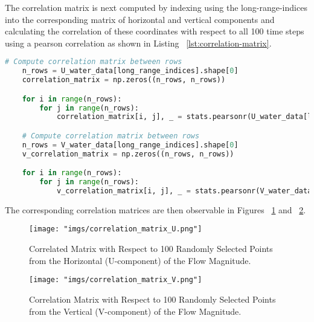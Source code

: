 \documentclass[11pt]{article}
\begin{document}
The correlation matrix is next computed by indexing using the long-range-indices into the corresponding matrix of horizontal and vertical components and calculating the correlation of these coordinates with respect to all 100 time steps using a pearson correlation as shown in Listing ~\ref{lst:correlation-matrix}.

\begin{lstlisting}[language=Python, label=lst:correlation-matrix, caption={Caluclating the correlation matrix for the horiztonal U-component of the flow magnitude.}]
    # Compute correlation matrix between rows
    n_rows = U_water_data[long_range_indices].shape[0]
    correlation_matrix = np.zeros((n_rows, n_rows))

    for i in range(n_rows):
        for j in range(n_rows):
            correlation_matrix[i, j], _ = stats.pearsonr(U_water_data[long_range_indices][i], U_water_data[long_range_indices][j])

    # Compute correlation matrix between rows
    n_rows = V_water_data[long_range_indices].shape[0]
    v_correlation_matrix = np.zeros((n_rows, n_rows))

    for i in range(n_rows):
        for j in range(n_rows):
            v_correlation_matrix[i, j], _ = stats.pearsonr(V_water_data[long_range_indices][i], V_water_data[long_range_indices][j])
\end{lstlisting}

The corresponding correlation matrices are then observable in Figures ~\ref{fig:correlation-matrix-U} and ~\ref{fig:correlation-matrix-V}.

\begin{figure}[htbp]
    \centering
    \texttt{[image: "imgs/correlation\_matrix\_U.png"]} %
    \caption{Correlated Matrix with Respect to 100 Randomly Selected Points from the Horizontal (U-component) of the Flow Magnitude.}
    \label{fig:correlation-matrix-U}
\end{figure}
\FloatBarrier


\begin{figure}[htbp]
    \centering
    \texttt{[image: "imgs/correlation\_matrix\_V.png"]} %
    \caption{Correlation Matrix with Respect to 100 Randomly Selected Points from the Vertical (V-component) of the Flow Magnitude.}
    \label{fig:correlation-matrix-V}
\end{figure}
\FloatBarrier
\end{document}
